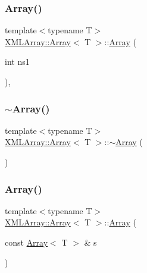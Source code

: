 \subsubsection{\texorpdfstring{Array()}{Array()}\hspace{0.1cm}{\footnotesize\ttfamily [5/6]}}
{\footnotesize\ttfamily template$<$typename T$>$ \\
\mbox{\hyperlink{classXMLArray_1_1Array}{X\+M\+L\+Array\+::\+Array}}$<$ T $>$\+::\mbox{\hyperlink{classXMLArray_1_1Array}{Array}} (\begin{DoxyParamCaption}\item[{int}]{ns1 }\end{DoxyParamCaption})\hspace{0.3cm}{\ttfamily [inline]}, {\ttfamily [explicit]}}

\mbox{\label{classXMLArray_1_1Array_ae344c6bdb93a8e4e2b5b42fda7abf94d}} 
\subsubsection{\texorpdfstring{$\sim$Array()}{~Array()}\hspace{0.1cm}{\footnotesize\ttfamily [2/2]}}
{\footnotesize\ttfamily template$<$typename T$>$ \\
\mbox{\hyperlink{classXMLArray_1_1Array}{X\+M\+L\+Array\+::\+Array}}$<$ T $>$\+::$\sim$\mbox{\hyperlink{classXMLArray_1_1Array}{Array}} (\begin{DoxyParamCaption}{ }\end{DoxyParamCaption})\hspace{0.3cm}{\ttfamily [inline]}}

\mbox{\label{classXMLArray_1_1Array_ab755ad52a24c32ad23940b23b1d03968}} 
\subsubsection{\texorpdfstring{Array()}{Array()}\hspace{0.1cm}{\footnotesize\ttfamily [6/6]}}
{\footnotesize\ttfamily template$<$typename T$>$ \\
\mbox{\hyperlink{classXMLArray_1_1Array}{X\+M\+L\+Array\+::\+Array}}$<$ T $>$\+::\mbox{\hyperlink{classXMLArray_1_1Array}{Array}} (\begin{DoxyParamCaption}\item[{const \mbox{\hyperlink{classXMLArray_1_1Array}{Array}}$<$ T $>$ \&}]{s }\end{DoxyParamCaption})\hspace{0.3cm}{\ttfamily [inline]}}



